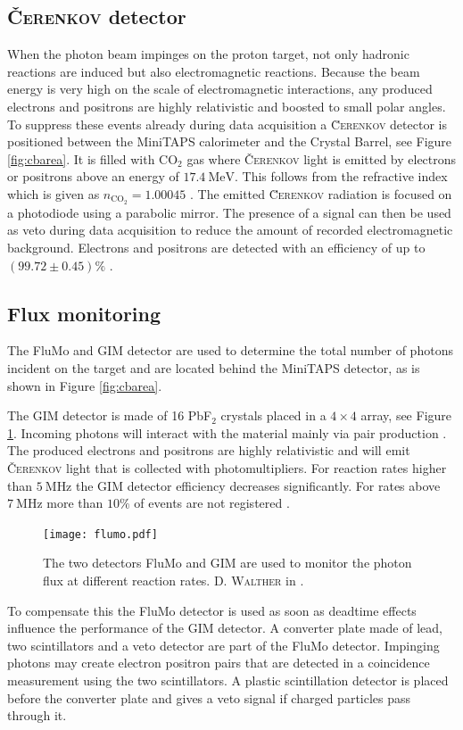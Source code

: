 \subsection{\textsc{\v Cerenkov} detector}
\label{sec:cerenkov}
When the photon beam impinges on the proton target, not only hadronic reactions are induced but also electromagnetic reactions. Because the beam energy is very high on the scale of electromagnetic interactions, any produced electrons and positrons are highly relativistic and boosted to small polar angles. To suppress these events already during data acquisition a \textsc{\u Cerenkov} detector \cite{cerenkov} is positioned between the MiniTAPS calorimeter and the Crystal Barrel, see Figure \ref{fig:cbarea}. It is filled with CO$_2$ gas where \textsc{\v Cerenkov} light is emitted by electrons or positrons above an energy of $\SI{17.4}{\mega\eV}$. This follows from the refractive index which is given as $n_{\text{CO}_2}=1.00045$ \cite{prop}. The emitted \textsc{\u Cerenkov} radiation is focused on a photodiode using a parabolic mirror. The presence of a signal can then be used as veto during data acquisition to reduce the amount of recorded electromagnetic background. Electrons and positrons are detected with an efficiency of up to $(99.72\pm0.45)\%$ \cite{cerenkov}.
\subsection{Flux monitoring}
\label{sec:flumo}
The FluMo and GIM detector are used to determine the total number of photons incident on the target and are located behind the MiniTAPS detector, as is shown in Figure \ref{fig:cbarea}.

The GIM detector \cite{gim} is made of 16 PbF$_2$ crystals placed in a $4\times4$ array, see Figure \ref{fig:gim}. Incoming photons will interact with the material mainly via pair production \cite{leo}. The produced electrons and positrons are highly relativistic and will emit \textsc{\v Cerenkov} light that is collected with photomultipliers. For reaction rates higher than $\SI{5}{\mega\Hz}$ the GIM detector efficiency decreases significantly. For rates above $\SI{7}{\mega\Hz}$ more than $10\%$ of events are not registered \cite{hartmanndipl}. 
\begin{figure}[htbp]
	\centering
	\texttt{[image: flumo.pdf]}
	\caption{The two detectors FluMo and GIM are used to monitor the photon flux at different reaction rates. \textsc{D. Walther} in \cite{farahphd}.}
	\label{fig:gim}
\end{figure}  
To compensate this the FluMo detector \cite{flumo} is used as soon as deadtime effects influence the performance of the GIM detector. A converter plate made of lead, two scintillators and a veto detector are part of the FluMo detector. Impinging photons may create electron positron pairs that are detected in a coincidence measurement using the two scintillators. A plastic scintillation detector is placed before the converter plate and gives a veto signal if charged particles pass through it.

